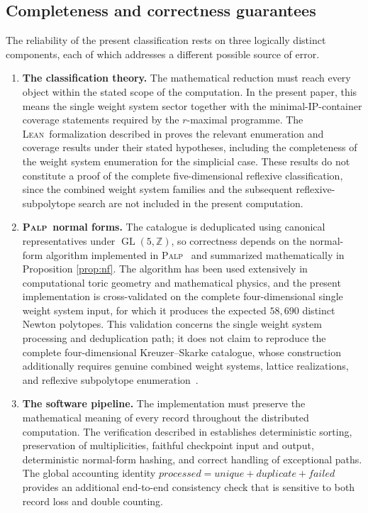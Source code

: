\documentclass[appliedmath,article,submit,moreauthors]{Definitions/mdpi}
\newcommand{\Z}{\mathbb{Z}}
\newcommand{\GL}{\operatorname{GL}}
\newcommand{\Lean}{\textsc{Lean}}
\newcommand{\PALP}{\textsc{Palp}}
\begin{document}
\subsection{Completeness and correctness guarantees}
\label{sec:discussion-correctness}

The reliability of the present classification rests on three logically distinct
components, each of which addresses a different possible source of error.

\begin{enumerate}

\item \textbf{The classification theory.} The mathematical reduction must reach
every object within the stated scope of the computation. In the present paper,
this means the single weight system sector together with the
minimal-IP-container coverage statements required by the \(r\)-maximal
programme. The \Lean\ formalization described in 
proves the relevant enumeration and coverage results under their stated
hypotheses, including the completeness of the weight system enumeration for the
simplicial case. These results do not constitute a proof of the complete
five-dimensional reflexive classification, since the combined weight system
families and the subsequent reflexive-subpolytope search are not included in the
present computation.

\item \textbf{\PALP\ normal forms.} The catalogue is deduplicated using
canonical representatives under \(\GL(5,\Z)\), so correctness depends on the
normal-form algorithm implemented in \PALP~\cite{PALP} and summarized
mathematically in Proposition \ref{prop:nf}. {\color{blue}The algorithm has been used
extensively in computational toric geometry and mathematical physics, and the
present implementation is cross-validated on the complete four-dimensional
single weight system input, for which it produces the expected \(58{,}690\)
distinct Newton polytopes. This validation concerns the single weight system
processing and deduplication path; it does not claim to reproduce the complete
four-dimensional Kreuzer--Skarke catalogue, whose construction additionally
requires genuine combined weight systems, lattice realizations, and reflexive
subpolytope enumeration~\cite{KreuzerSkarke2000,KSFibrations2002,KreuzerCYData}.}

\item \textbf{The software pipeline.} The implementation must preserve the
mathematical meaning of every record throughout the distributed computation. The
verification described in  establishes deterministic
sorting, preservation of multiplicities, faithful checkpoint input and output,
deterministic normal-form hashing, and correct handling of exceptional paths.
The global accounting identity
\(\mathit{processed}=\mathit{unique}+\mathit{duplicate}+\mathit{failed}\)
provides an additional end-to-end consistency check that is sensitive to both
record loss and double counting.

\end{enumerate}
\end{document}
